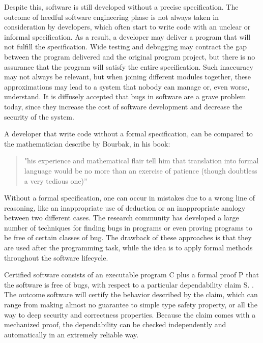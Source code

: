 \documentclass[target=mst,babel=\babelopt]{thud}[2014/01/17]
\begin{document}
Despite this, software is still developed without a precise
specification. The outcome of heedful software engineering phase is
not always taken in consideration by developers, which often start to
write code with an unclear or informal specification. As a result, a developer may
deliver a program that will not fulfill the specification.
Wide testing and debugging may contract the gap between the program
delivered and the original program project, but there is no assurance
that the program will satisfy the entire specification. Such inaccuracy may
not always be relevant, but when joining different modules together,
these approximations may lead to a system that nobody can manage or,
even worse, understand. It is diffusely accepted that bugs in software
are a grave problem today, since they increase the cost of software
development and decrease the security of the system.

A developer that write code without a formal specification, can be compared to the
mathematician describe by Bourbak, in his book: \cite{Bourbaki98}
\begin{quote}
"his experience and mathematical flair tell him that translation into formal language would be no 
more than an exercise of patience (though doubtless a very tedious one)''
\end{quote}
Without a formal specification, one can occur in mistakes due to a
wrong line of reasoning, like an inappropriate use of deduction or an
inappropriate analogy between two different cases. The research
community has developed a large number of techniques for finding bugs
in programs or even proving programs to be free of certain classes of
bug. The drawback of these approaches is that they are used after the
programming task, while the idea is to apply formal methods throughout
the software lifecycle.

Certified software consists of an executable program C plus a formal
proof P that the software is free of bugs, with respect to a particular
dependability claim S. \cite{Shao10}. The outcome
software will certify the behavior described by the claim, which
can range from making almost no guarantee to simple type safety property, or all
the way to deep security and correctness properties. Because the claim
comes with a mechanized proof, the dependability can be checked
independently and automatically in an extremely reliable way.
\end{document}
